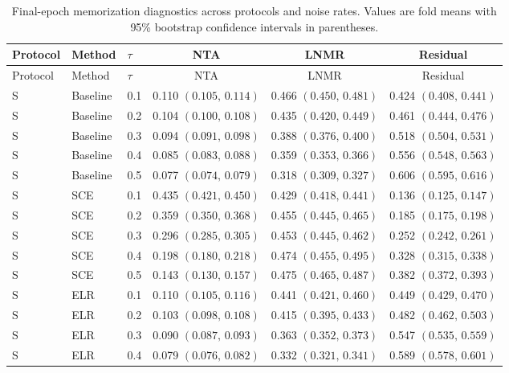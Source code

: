 
\begin{small}
\setlength{\LTcapwidth}{\textwidth}
\begin{longtable}{lllccc}
\caption{Final-epoch memorization diagnostics across protocols and noise rates. Values are fold means with 95\% bootstrap confidence intervals in parentheses.}\label{tab:app-mechanism-full}\\
\toprule
Protocol & Method & $\tau$ & NTA & LNMR & Residual \\
\midrule
\endfirsthead
\toprule
Protocol & Method & $\tau$ & NTA & LNMR & Residual \\
\midrule
\endhead
S & Baseline & 0.1 & 0.110 $(0.105,\,0.114)$ & 0.466 $(0.450,\,0.481)$ & 0.424 $(0.408,\,0.441)$ \\
S & Baseline & 0.2 & 0.104 $(0.100,\,0.108)$ & 0.435 $(0.420,\,0.449)$ & 0.461 $(0.444,\,0.476)$ \\
S & Baseline & 0.3 & 0.094 $(0.091,\,0.098)$ & 0.388 $(0.376,\,0.400)$ & 0.518 $(0.504,\,0.531)$ \\
S & Baseline & 0.4 & 0.085 $(0.083,\,0.088)$ & 0.359 $(0.353,\,0.366)$ & 0.556 $(0.548,\,0.563)$ \\
S & Baseline & 0.5 & 0.077 $(0.074,\,0.079)$ & 0.318 $(0.309,\,0.327)$ & 0.606 $(0.595,\,0.616)$ \\
S & SCE & 0.1 & 0.435 $(0.421,\,0.450)$ & 0.429 $(0.418,\,0.441)$ & 0.136 $(0.125,\,0.147)$ \\
S & SCE & 0.2 & 0.359 $(0.350,\,0.368)$ & 0.455 $(0.445,\,0.465)$ & 0.185 $(0.175,\,0.198)$ \\
S & SCE & 0.3 & 0.296 $(0.285,\,0.305)$ & 0.453 $(0.445,\,0.462)$ & 0.252 $(0.242,\,0.261)$ \\
S & SCE & 0.4 & 0.198 $(0.180,\,0.218)$ & 0.474 $(0.455,\,0.495)$ & 0.328 $(0.315,\,0.338)$ \\
S & SCE & 0.5 & 0.143 $(0.130,\,0.157)$ & 0.475 $(0.465,\,0.487)$ & 0.382 $(0.372,\,0.393)$ \\
S & ELR & 0.1 & 0.110 $(0.105,\,0.116)$ & 0.441 $(0.421,\,0.460)$ & 0.449 $(0.429,\,0.470)$ \\
S & ELR & 0.2 & 0.103 $(0.098,\,0.108)$ & 0.415 $(0.395,\,0.433)$ & 0.482 $(0.462,\,0.503)$ \\
S & ELR & 0.3 & 0.090 $(0.087,\,0.093)$ & 0.363 $(0.352,\,0.373)$ & 0.547 $(0.535,\,0.559)$ \\
S & ELR & 0.4 & 0.079 $(0.076,\,0.082)$ & 0.332 $(0.321,\,0.341)$ & 0.589 $(0.578,\,0.601)$ \\

\end{longtable}
\end{small}
